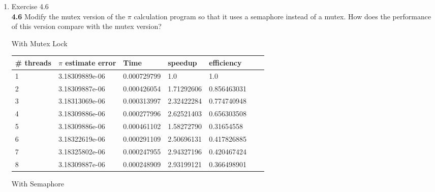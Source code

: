 \documentclass[11pt,epsfig,letterpaper]{article}
\begin{document}
\begin{enumerate}
            \item Exercise 4.6 \\
            {\bf 4.6}\>\> Modify the mutex version of the $\pi$ calculation program so that it uses a semaphore instead of a mutex. How does the performance of this version compare with the mutex version?
            \vspace{0.5pc}

            \begin{center}

            With Mutex Lock
            \vspace{0.5pc}

            \begin{tabular}{ | l | l | l | l | l | l | p{10cm} |}
            \hline
            \# threads & $\pi$ estimate error & Time & speedup & efficiency \\ \hline
            1 & 3.18309889e-06 & 0.000729799 & 1.0        & 1.0         \\ \hline
            2 & 3.18309887e-06 & 0.000426054 & 1.71292606 & 0.856463031 \\ \hline
            3 & 3.18313069e-06 & 0.000313997 & 2.32422284 & 0.774740948 \\ \hline
            4 & 3.18309886e-06 & 0.000277996 & 2.62521403 & 0.656303508 \\ \hline
            5 & 3.18309886e-06 & 0.000461102 & 1.58272790 & 0.31654558  \\ \hline
            6 & 3.18322619e-06 & 0.000291109 & 2.50696131 & 0.417826885 \\ \hline
            7 & 3.18325802e-06 & 0.000247955 & 2.94327196 & 0.420467424 \\ \hline
            8 & 3.18309887e-06 & 0.000248909 & 2.93199121 & 0.366498901 \\ \hline
            \end{tabular}
            \vspace{1pc}
            \pagebreak

            With Semaphore


\end{center}
\end{enumerate}
\end{document}
